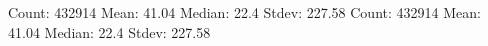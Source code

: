 Count: 432914
Mean: 41.04
Median: 22.4
Stdev: 227.58
Count: 432914
Mean: 41.04
Median: 22.4
Stdev: 227.58
